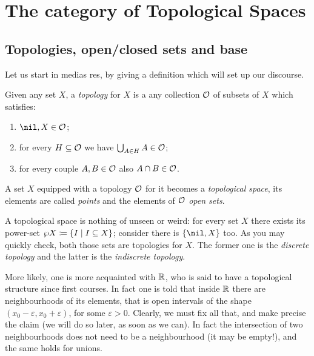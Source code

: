 
\section{The category of Topological Spaces}

\subsection{Topologies, open/closed sets and base}

Let us start in medias res, by giving a definition which will set up our discourse.

\begin{definition}\label{definition:DefTop}
Given any set \(X\), a {\em topology} for \(X\) is a any collection \(\mathcal O\) of subsets of \(X\) which satisfies:
\begin{enumerate}
\item \(\nil, X \in \calO\);
\item for every \(H \subseteq \mathcal O\) we have \(\bigcup_{A \in H} A \in \mathcal O\);
\item for every couple \(A, B \in \mathcal O\) also \(A \cap B \in \mathcal O\).
\end{enumerate}
A set \(X\) equipped with a topology \(\mathcal O\) for it becomes a {\em topological space}, its elements are called {\em points} and the elements of \(\mathcal O\) {\em open sets}. 
\end{definition}

A topological space is nothing of unseen or weird: for every set \(X\) there exists its power-set \(\wp X \coloneq \left\{I \mid I \subseteq X\right\}\); consider there is \(\set{\nil, X}\) too. As you may quickly check, both those sets are topologies for \(X\). The former one is the {\em discrete topology} and the latter is the {\em indiscrete topology}.

\begin{example}
More likely, one is more acquainted with \(\mathbb R\), who is said to have a topological structure since first courses. In fact one is told that inside \(\mathbb R\) there are neighbourhoods of its elements, that is open intervals of the shape \((x_0-\varepsilon, x_0+\varepsilon)\), for some \(\varepsilon >0\). Clearly, we must fix all that, and make precise the claim  (we will do so later, as soon as we can). In fact the intersection of two neighbourhoods does not need to be a neighbourhood (it may be empty!), and the same holds for unions.
\end{example}

